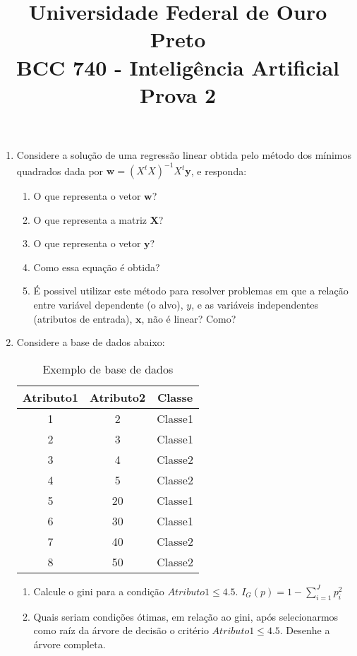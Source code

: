 \documentclass{article}
\title{\vspace{-2 cm} Universidade Federal de Ouro Preto \\ BCC 740 - Inteligência Artificial \\ Prova 2}
\date{}
\begin{document}
\maketitle

\vspace{-2 cm}
\begin{enumerate}

\item Considere a solução de uma regressão linear obtida pelo método dos mínimos quadrados dada por $\mathbf{w} = (X^{t}X)^{-1}X^t\mathbf{y}$, e responda:
\begin{enumerate}
    \item O que representa o vetor $\mathbf{w}$?
    \item O que representa a matriz $\mathbf{X}$?
    \item O que representa o vetor $\mathbf{y}$?
    \item Como essa equação é obtida?
    \item É possivel utilizar este método para resolver problemas em que a relação entre variável dependente (o alvo), $y$, e as variáveis independentes (atributos de entrada), $\mathbf{x}$, não é linear? Como?  
\end{enumerate}

\item Considere a base de dados abaixo:

\begin{table}[h!]
    \footnotesize
    \centering
    \begin{tabular}{|c|c|c|}
    \hline
    \textbf{Atributo1} & \textbf{Atributo2} & \textbf{Classe} \\
    \hline
    1 & 2 & Classe1 \\
    2 & 3 & Classe1 \\
    3 & 4 & Classe2 \\
    4 & 5 & Classe2 \\
    5 & 20 & Classe1 \\
    6 & 30 & Classe1 \\
    7 & 40 & Classe2 \\
    8 & 50 & Classe2 \\
    \hline
    \end{tabular}
    \caption{Exemplo de base de dados}
    \label{tab:exemplo}
\end{table}

\begin{enumerate}
    \item Calcule o gini para a condição $Atributo1 \leq 4.5$. $I_{G}(p) = 1 - \sum_{i=1}^{J} p_{i}^{2}$
    \item Quais seriam condições ótimas, em relação ao gini, após selecionarmos como raíz da árvore de decisão o critério $Atributo1 \leq 4.5$. Desenhe a árvore completa.
\end{enumerate}


\end{enumerate}
\end{document}
